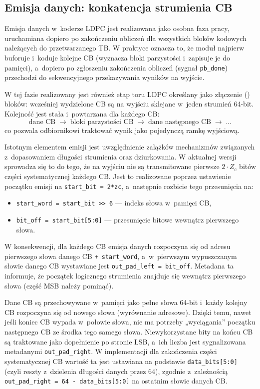 \subsection{Emisja danych: konkatencja strumienia CB}
\label{subsec:ldpc_encode_emisja}

Emisja danych w~koderze LDPC jest realizowana jako osobna faza pracy, uruchamiana dopiero po zakończeniu obliczeń dla wszystkich bloków kodowych należących do przetwarzanego TB. W praktyce oznacza to, że moduł najpierw buforuje i~koduje kolejne CB (wyznacza bloki parzystości i~zapisuje je do pamięci), a~dopiero po zgłoszeniu zakończenia obliczeń (sygnał \texttt{pb\_done}) przechodzi do sekwencyjnego przekazywania wyników na wyjście.

W tej fazie realizowany jest również etap toru LDPC określany jako złączenie () bloków: wcześniej wydzielone CB są na wyjściu sklejane w~jeden strumień 64-bit. Kolejność jest stała i~powtarzana dla każdego CB:
\[
\text{dane CB} \;\rightarrow\; \text{bloki parzystości CB} \;\rightarrow\; \text{dane następnego CB} \;\rightarrow\; ...
\]
co pozwala odbiornikowi traktować wynik jako pojedynczą ramkę wyjściową.

Istotnym elementem emisji jest uwzględnienie zalążków mechanizmów związanych z~dopasowaniem długości strumienia oraz dziurkowania. W aktualnej wersji sprowadza się to do tego, że na wyjściu nie są transmitowane pierwsze $2\cdot Z_c$ bitów części systematycznej każdego CB. Jest to realizowane poprzez ustawienie początku emisji na \texttt{start\_bit = 2*zc}, a~następnie rozbicie tego przesunięcia na:
\begin{itemize}
    \item \texttt{start\_word = start\_bit >> 6} --- indeks słowa w~pamięci CB,
    \item \texttt{bit\_off = start\_bit[5:0]} --- przesunięcie bitowe wewnątrz pierwszego słowa.
\end{itemize}
W konsekwencji, dla każdego CB emisja danych rozpoczyna się od adresu pierwszego słowa danego CB \texttt{+ start\_word}, a~w~pierwszym wypuszczanym słowie danego CB wystawiane jest \texttt{out\_pad\_left = bit\_off}. Metadana ta informuje, że początek logicznego strumienia znajduje się wewnątrz pierwszego słowa (część MSB należy pominąć).

Dane CB są przechowywane w~pamięci jako pełne słowa 64-bit i~każdy kolejny CB rozpoczyna się od nowego słowa (wyrównanie adresowe). Dzięki temu, nawet jeśli koniec CB wypada w~połowie słowa, nie ma potrzeby „wyciągania” początku następnego CB ze środka tego samego słowa. Niewykorzystane bity na końcu CB są traktowane jako dopełnienie po stronie LSB, a~ich liczba jest sygnalizowana metadanymi \texttt{out\_pad\_right}. W implementacji dla zakończenia części systematycznej CB wartość ta jest ustawiana na podstawie \texttt{data\_bits[5:0]} (czyli reszty z~dzielenia długości danych przez 64), zgodnie z~zależnością \texttt{out\_pad\_right = 64 - data\_bits[5:0]} na ostatnim słowie danych CB.

